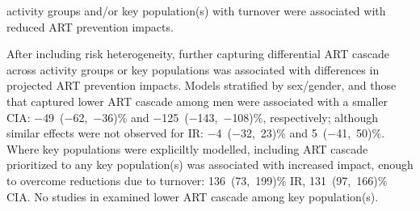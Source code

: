 activity groups and/or key population(s) with turnover
were associated with reduced ART prevention impacts.
\par
After including risk heterogeneity,
further capturing differential ART cascade across activity groups or key populations
was associated with differences in projected ART prevention impacts.
Models stratified by sex/gender, and those that captured lower ART cascade among men
were associated with a smaller CIA:
$-$49~($-$62,~$-$36)\% and $-$125~($-$143,~$-$108)\%, respectively;
although similar effects were not observed for IR:
$-$4~($-$32,~23)\% and 5~($-$41,~50)\%.
Where key populations were expliciltly modelled,
including ART cascade prioritized to any key population(s)
was associated with increased impact, enough to overcome reductions due to turnover:
136~(73,~199)\% IR, 131~(97,~166)\% CIA.
No studies in  examined lower ART cascade among key population(s).
